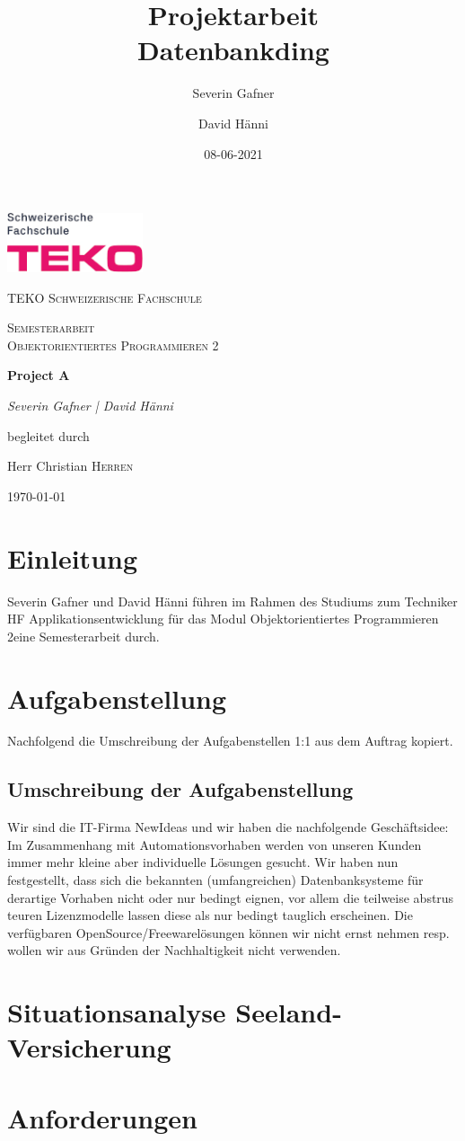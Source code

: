 \documentclass{article}
\title{Projektarbeit \\ Datenbankding}
\date{08-06-2021}
\author{Severin Gafner \and David Hänni}
\newcommand{\Cmodule}{Objektorientiertes Programmieren 2}
\begin{document}
\begin{titlepage}
	\centering
	\includegraphics[width=0.3\textwidth]{images/teko-logo-pink.jpg}\par\vspace{1cm}
	{\scshape\LARGE TEKO Schweizerische Fachschule \par}
	\vspace{1cm}
	{\scshape\Large Semesterarbeit \\ \Cmodule\par}
	\vspace{1.5cm}
	{\huge\bfseries Project A\par}
	\vspace{2cm}
	{\Large\itshape Severin Gafner | David Hänni\par}
	\vfill
	begleitet durch\par
	Herr Christian \textsc{Herren}

	\vfill

	{\large \germanformat\today\par}
\end{titlepage}
\newpage
{}

\section{Einleitung}

Severin Gafner und David Hänni führen im Rahmen des Studiums zum Techniker HF Applikationsentwicklung für das Modul \Cmodule eine Semesterarbeit durch. 

\section{Aufgabenstellung}
Nachfolgend die Umschreibung der Aufgabenstellen 1:1 aus dem Auftrag kopiert.
\subsection{Umschreibung der Aufgabenstellung}
Wir sind die IT-Firma NewIdeas und wir haben die nachfolgende Geschäftsidee: 
Im Zusammenhang mit Automationsvorhaben werden von unseren Kunden immer mehr kleine aber individuelle Lösungen gesucht. 
Wir haben nun festgestellt, dass sich die bekannten (umfangreichen) Datenbanksysteme für derartige Vorhaben nicht oder nur bedingt eignen, vor allem die teilweise abstrus teuren Lizenzmodelle lassen diese als nur bedingt tauglich erscheinen. 
Die verfügbaren OpenSource/Freewarelösungen können wir nicht ernst nehmen resp. wollen wir aus Gründen der Nachhaltigkeit nicht verwenden. 
\section{Situationsanalyse Seeland-Versicherung}

\section{Anforderungen}
\end{document}
